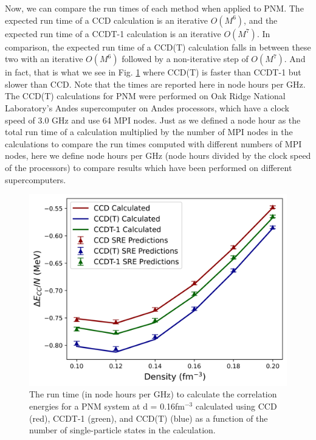 Now, we can compare the run times of each method when applied to PNM.  The expected run time of a CCD calculation is an iterative $O(M^6)$, and the expected run time of a CCDT-1 calculation is an iterative $O(M^7)$.  In comparison, the expected run time of a CCD(T) calculation falls in between these two with an iterative $O(M^6)$ followed by a non-iterative step of $O(M^7)$.  And in fact, that is what we see in Fig. \ref{fig:all_times_pnm} where CCD(T) is faster than CCDT-1 but slower than CCD. Note that the times are reported here in node hours per GHz.  The CCD(T) calculations for PNM were performed on Oak Ridge National Laboratory's Andes supercomputer on Andes processors, which have a clock speed of 3.0 GHz and use 64 MPI nodes.  Just as we defined a node hour as the total run time of a calculation multiplied by the number of MPI nodes in the calculations to compare the run times computed with different numbers of MPI nodes, here we define node hours per GHz (node hours divided by the clock speed of the processors) to compare results which have been performed on different supercomputers. 

\begin{figure}
    \centering
    \includegraphics{Images/Chapter8/FinalReport6.png}
    \caption{The run time (in node hours per GHz) to calculate the correlation energies for a PNM system at d = 0.16fm$^{-3}$ calculated using CCD (red), CCDT-1 (green), and CCD(T) (blue) as a function of the number of single-particle states in the calculation.}
    \label{fig:all_times_pnm}
\end{figure}

